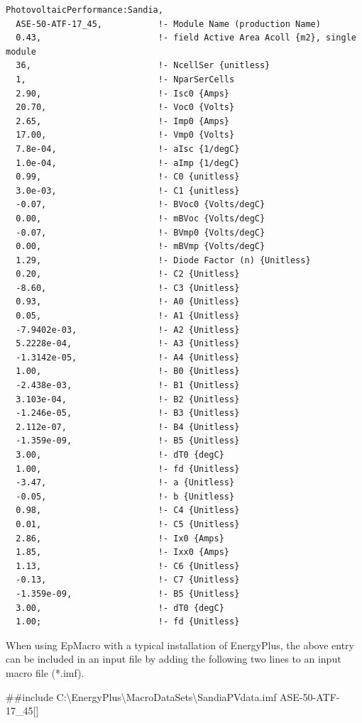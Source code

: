 \begin{lstlisting}
PhotovoltaicPerformance:Sandia,
  ASE-50-ATF-17_45,           !- Module Name (production Name)
  0.43,                       !- field Active Area Acoll {m2}, single module
  36,                         !- NcellSer {unitless}
  1,                          !- NparSerCells
  2.90,                       !- Isc0 {Amps}
  20.70,                      !- Voc0 {Volts}
  2.65,                       !- Imp0 {Amps}
  17.00,                      !- Vmp0 {Volts}
  7.8e-04,                    !- aIsc {1/degC}
  1.0e-04,                    !- aImp {1/degC}
  0.99,                       !- C0 {unitless}
  3.0e-03,                    !- C1 {unitless}
  -0.07,                      !- BVoc0 {Volts/degC}
  0.00,                       !- mBVoc {Volts/degC}
  -0.07,                      !- BVmp0 {Volts/degC}
  0.00,                       !- mBVmp {Volts/degC}
  1.29,                       !- Diode Factor (n) {Unitless}
  0.20,                       !- C2 {Unitless}
  -8.60,                      !- C3 {Unitless}
  0.93,                       !- A0 {Unitless}
  0.05,                       !- A1 {Unitless}
  -7.9402e-03,                !- A2 {Unitless}
  5.2228e-04,                 !- A3 {Unitless}
  -1.3142e-05,                !- A4 {Unitless}
  1.00,                       !- B0 {Unitless}
  -2.438e-03,                 !- B1 {Unitless}
  3.103e-04,                  !- B2 {Unitless}
  -1.246e-05,                 !- B3 {Unitless}
  2.112e-07,                  !- B4 {Unitless}
  -1.359e-09,                 !- B5 {Unitless}
  3.00,                       !- dT0 {degC}
  1.00,                       !- fd {Unitless}
  -3.47,                      !- a {Unitless}
  -0.05,                      !- b {Unitless}
  0.98,                       !- C4 {Unitless}
  0.01,                       !- C5 {Unitless}
  2.86,                       !- Ix0 {Amps}
  1.85,                       !- Ixx0 {Amps}
  1.13,                       !- C6 {Unitless}
  -0.13,                      !- C7 {Unitless}
  -1.359e-09,                 !- B5 {Unitless}
  3.00,                       !- dT0 {degC}
  1.00;                       !- fd {Unitless}
\end{lstlisting}

When using EpMacro with a typical installation of EnergyPlus, the above entry can be included in an input file by adding the following two lines to an input macro file (*.imf).

\#\#include C:\textbackslash{}EnergyPlus\textbackslash{}MacroDataSets\textbackslash{}SandiaPVdata.imf ASE-50-ATF-17\_45{[]}

